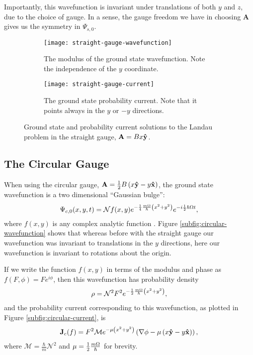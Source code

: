 Importantly, this wavefunction is invariant under translations of both $y$ and
$z$, due to the choice of gauge. In a sense, the gauge freedom we have in
choosing $\mathbf{A}$ gives us the symmetry in $\Psi_{s,0}$.

\begin{figure}
    \centering
    \begin{subfigure}{0.45\linewidth}
        \centering
        \texttt{[image: straight-gauge-wavefunction]}
        \caption{The modulus of the ground state wavefunction. Note the
            independence of the $y$ coordinate.}
        \label{subfig:straight-wavefunction}
    \end{subfigure}
    \begin{subfigure}{0.45\linewidth}
        \centering
        \texttt{[image: straight-gauge-current]}
        \caption{The ground state probability current. Note that it points
            always in the $y$ or $-y$ directions.}
        \label{subfig:straight-current}
    \end{subfigure}
    \caption{Ground state and probability current solutions to the Landau
    problem in the straight gauge, $\mathbf{A} = Bx\mathbf{\hat y }$.}
    \label{fig:straight}
\end{figure}

\subsection{The Circular Gauge}

When using the circular gauge, $\mathbf{A} = \frac{1}{2} B \left( x \mathbf{\hat y } -
y \mathbf{\hat x } \right)$, the ground state wavefunction is a two dimensional
``Gaussian bulge'':
\begin{align}
    \Psi_{c,0}(x, y, t) = \mathcal{N} f(x,y) e^{- \frac{1}{4} \frac{m \Omega}{\hbar} \left( x^2 +
        y^2 \right)} e^{-i \frac{1}{2} \hbar \Omega t},
\end{align}
where $f(x,y)$ is any complex analytic function \cite{murayama}. Figure
\ref{subfig:circular-wavefunction} shows that whereas before with the straight
gauge our wavefunction was invariant to translations in the $y$ directions, here
our wavefunction is invariant to rotations about the origin.

If we write the function $f(x,y)$ in terms of the modulus and phase as
$f(F,\phi) = Fe^{i \phi}$, then this wavefunction has probability density
\begin{align}
    \rho = \mathcal{N}^2 F^2 e^{- \frac{1}{2} \frac{m \Omega}{\hbar} \left( x^2 + y^2 \right)},
    \label{eqn:circular-density}
\end{align}
and the probability current corresponding to this wavefunction, as plotted in
Figure \ref{subfig:circular-current}, is
\begin{align}
    \mathbf{J}_c(f) = F^2 \mathcal{M} e^{- \mu
        \left( x^2 + y^2 \right)} \left( \nabla \phi - \mu \left(
        x\mathbf{\hat y } - y\mathbf{\hat x } \right) \right),
\end{align}
where $\mathcal{M} = \frac{\hbar}{m} \mathcal{N}^2$ and $\mu = \frac{1}{2}
\frac{m \Omega}{\hbar}$ for brevity.

